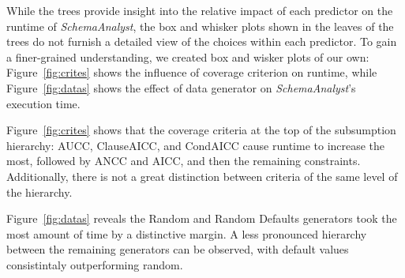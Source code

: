 
While the trees provide insight into the relative impact of each predictor on the runtime of \textit{SchemaAnalyst}, the
box and whisker plots shown in the leaves of the trees do not furnish a detailed view of the choices within each
predictor.  To gain a finer-grained understanding, we created box and wisker plots of our own:  Figure~\ref{fig:crites}
shows the influence of coverage criterion on runtime, while Figure~\ref{fig:datas} shows the effect of data generator on
{\em SchemaAnalyst}'s execution time.

Figure~\ref{fig:crites} shows that the coverage criteria at the top of the subsumption hierarchy: AUCC, ClauseAICC, and
CondAICC cause runtime to increase the most, followed by ANCC and AICC, and then the remaining constraints.
Additionally, there is not a great distinction between criteria of the same level of the hierarchy.

Figure~\ref{fig:datas} reveals the Random and Random Defaults generators took the most amount of time by a distinctive
margin. A less pronounced hierarchy between the remaining generators can be observed, with default values consistintaly
outperforming random.

